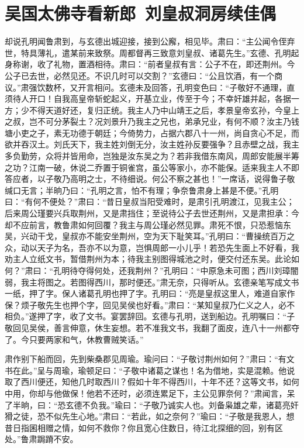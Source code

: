 \chapter{吴国太佛寺看新郎~刘皇叔洞房续佳偶}

却说孔明闻鲁肃到，与玄德出城迎接，接到公廨，相见毕。肃曰：“主公闻令侄弃世，特具薄礼，遣某前来致祭。周都督再三致意刘皇叔、诸葛先生。”玄德、孔明起身称谢，收了礼物，置酒相待。肃曰：“前者皇叔有言：公子不在，即还荆州。今公子已去世，必然见还。不识几时可以交割？”玄德曰：“公且饮酒，有一个商议。”肃强饮数杯，又开言相问。玄德未及回答，孔明变色曰：“子敬好不通理，直须待人开口！自我高皇帝斩蛇起义，开基立业，传至于今；不幸奸雄并起，各据一方；少不得天道好还，复归正统。我主人乃中山靖王之后，孝景皇帝玄孙，今皇上之叔，岂不可分茅裂土？况刘景升乃我主之兄也，弟承兄业，有何不顺？汝主乃钱塘小吏之子，素无功德于朝廷；今倚势力，占据六郡八十一州，尚自贪心不足，而欲并吞汉土。刘氏天下，我主姓刘倒无分，汝主姓孙反要强争？且赤壁之战，我主多负勤劳，众将并皆用命，岂独是汝东吴之为？若非我借东南风，周郎安能展半筹之功？江南一破，休说二乔置于铜雀宫，虽公等家小，亦不能保。适来我主人不即答应者，以子敬乃高明之士，不待细说。何公不察之甚也！”一席话，说得鲁子敬缄口无言；半晌乃曰：“孔明之言，怕不有理；争奈鲁肃身上甚是不便。”孔明曰：“有何不便处？”肃曰：“昔日皇叔当阳受难时，是肃引孔明渡江，见我主公；后来周公瑾要兴兵取荆州，又是肃挡住；至说待公子去世还荆州，又是肃担承：今却不应前言，教鲁肃如何回覆？我主与周公瑾必然见罪。肃死不恨，只恐惹恼东吴，兴动干戈，皇叔亦不能安坐荆州，空为天下耻笑耳。”孔明曰：“曹操统百万之众，动以天子为名，吾亦不以为意，岂惧周郎一小儿乎！若恐先生面上不好看，我劝主人立纸文书，暂借荆州为本；待我主别图得城池之时，便交付还东吴。此论如何？”肃曰：“孔明待夺得何处，还我荆州？”孔明曰：“中原急未可图；西川刘璋闇弱，我主将图之。若图得西川，那时便还。”肃无奈，只得听从。玄德亲笔写成文书一纸，押了字。保人诸葛孔明也押了字。孔明曰：“亮是皇叔这里人，难道自家作保？烦子敬先生也押个字，回见吴侯也好看。”肃曰：“某知皇叔乃仁义之人，必不相负。”遂押了字，收了文书。宴罢辞回。玄德与孔明，送到船边。孔明嘱曰：“子敬回见吴侯，善言伸意，休生妄想。若不准我文书，我翻了面皮，连八十一州都夺了。今只要两家和气，休教曹贼笑话。”

肃作别下船而回，先到柴桑郡见周瑜。瑜问曰：“子敬讨荆州如何？”肃曰：“有文书在此。”呈与周瑜，瑜顿足曰：“子敬中诸葛之谋也！名为借地，实是混赖。他说取了西川便还，知他几时取西川？假如十年不得西川，十年不还？这等文书，如何中用，你却与他做保！他若不还时，必须连累足下，主公见罪奈何？”肃闻言，呆了半晌，曰：“恐玄德不负我。”瑜曰：“子敬乃诚实人也。刘备枭雄之辈，诸葛亮奸猾之徒，恐不似先生心地。”肃曰：“若此，如之奈何？”瑜曰：“子敬是我恩人，想昔日指囷相赠之情，如何不救你？你且宽心住数日，待江北探细的回，别有区处。”鲁肃跼蹐不安。

